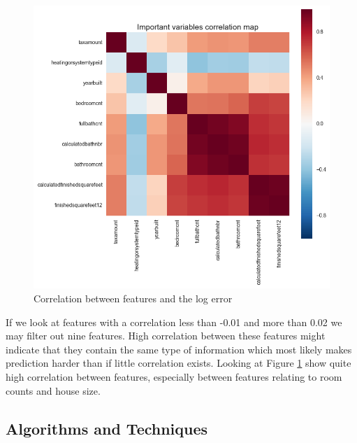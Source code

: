 \documentclass[a4paper]{article}
\begin{document}
\begin{figure}
\centering
\includegraphics[width=1\textwidth]{./img/prop-corr-feature.png}
\caption{\label{fig:prop-corr-feature} Correlation between features and the log error}
\end{figure}
If we look at features with a correlation less than -0.01 and more than 0.02 we may filter out nine features. High correlation between these features might indicate that they contain the same type of information which most likely makes prediction harder than if little correlation exists. Looking at Figure \ref{fig:prop-corr-feature} show quite high correlation between features, especially between features relating to room counts and house size.



\subsection{Algorithms and Techniques}
\end{document}
